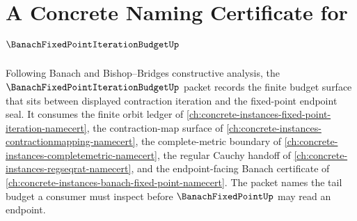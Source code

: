 \chapter{A Concrete Naming Certificate for $\BanachFixedPointIterationBudgetUp$}
\label{ch:concrete-instances-banach-fixed-point-iteration-budget-namecert}

Following Banach and Bishop--Bridges constructive analysis, the $\BanachFixedPointIterationBudgetUp$ packet records the finite budget surface that sits between displayed contraction iteration and the fixed-point endpoint seal. It consumes the finite orbit ledger of \autoref{ch:concrete-instances-fixed-point-iteration-namecert}, the contraction-map surface of \autoref{ch:concrete-instances-contractionmapping-namecert}, the complete-metric boundary of \autoref{ch:concrete-instances-completemetric-namecert}, the regular Cauchy handoff of \autoref{ch:concrete-instances-regseqrat-namecert}, and the endpoint-facing Banach certificate of \autoref{ch:concrete-instances-banach-fixed-point-namecert}. The packet names the tail budget a consumer must inspect before $\BanachFixedPointUp$ may read an endpoint.

